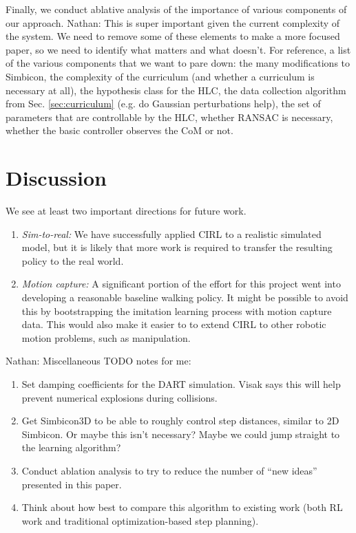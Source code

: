 \documentclass[a4paper]{article}
\newcommand{\nhatch}[1]{{\leavevmode\color{blue} Nathan: #1}}
\begin{document}
Finally, we conduct ablative analysis of the importance of various components of our approach.
\nhatch{This is super important given the current complexity of the system. We need to remove some of these elements to make a more focused paper, so we need to identify what matters and what doesn't.
For reference, a list of the various components that we want to pare down: the many modifications to Simbicon, the complexity of the curriculum (and whether a curriculum is necessary at all), the hypothesis class for the HLC, the data collection algorithm from Sec. \ref{sec:curriculum} (e.g. do Gaussian perturbations help), the set of parameters that are controllable by the HLC, whether RANSAC is necessary, whether the basic controller observes the CoM or not.}

\section{Discussion}

We see at least two important directions for future work.
\begin{enumerate}
  \item \emph{Sim-to-real:}
    We have successfully applied CIRL to a realistic simulated model, but it is likely that more work is required to transfer the resulting policy to the real world.
  \item \emph{Motion capture:}
    A significant portion of the effort for this project went into developing a reasonable baseline walking policy.
    It might be possible to avoid this by bootstrapping the imitation learning process with motion capture data.
    This would also make it easier to to extend CIRL to other robotic motion problems, such as manipulation.
\end{enumerate}

\nhatch{Miscellaneous TODO notes for me:
\begin{enumerate}
  \item Set damping coefficients for the DART simulation. Visak says this will help prevent numerical explosions during collisions.
  \item Get Simbicon3D to be able to roughly control step distances, similar to 2D Simbicon. Or maybe this isn't necessary? Maybe we could jump straight to the learning algorithm?
  \item Conduct ablation analysis to try to reduce the number of ``new ideas'' presented in this paper.
  \item Think about how best to compare this algorithm to existing work (both RL work and traditional optimization-based step planning).
\end{enumerate}
}



\end{document}
